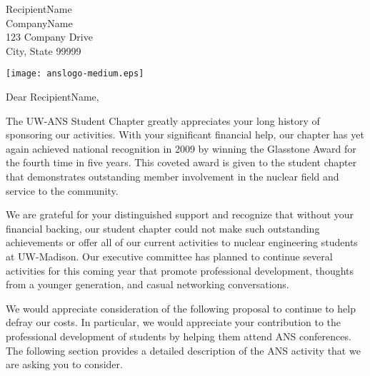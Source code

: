\documentclass{letter}
\begin{document}
%
%


 \begin{letter}{RecipientName\\
CompanyName\\
123 Company Drive\\
City, State 99999
}
\begin{center}
\texttt{[image: anslogo-medium.eps]}
\end{center}
	\opening{Dear RecipientName,}


The UW-ANS Student Chapter greatly appreciates your long history of sponsoring our activities.  With your significant financial help, our chapter has yet again achieved national recognition in 2009 by winning the Glasstone Award for the fourth time in five years. This coveted award is given to the student chapter that demonstrates outstanding member involvement in the nuclear field and service to the community. 

We are grateful for your distinguished support and recognize that without your financial backing, our student chapter could not make such outstanding achievements or offer all of our current activities to nuclear engineering students at UW-Madison.  Our executive committee has planned to continue several activities for this coming year that promote professional development, thoughts from a younger generation, and casual networking conversations.

We would appreciate consideration of the following proposal to continue to help defray our costs. In particular, we would appreciate your contribution to the professional development of students by helping them attend ANS conferences. The following section provides a detailed description of the ANS activity that we are asking you to consider. 


\end{letter}
\end{document}
